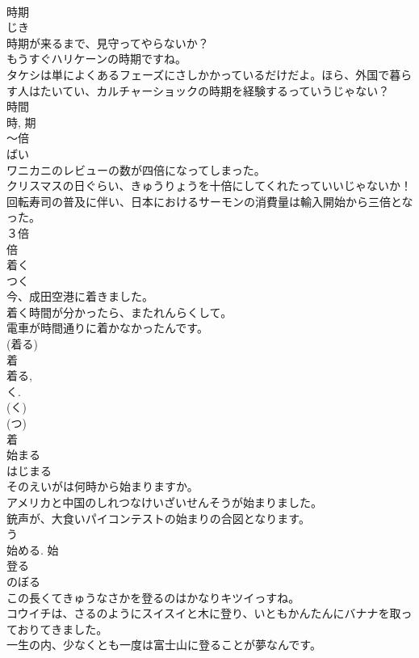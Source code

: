 \documentclass[8pt]{extreport}
\begin{document}
\begin{CJK}{UTF8}{min}
\\	時期	
\\	じき	
\\	時期が来るまで、見守ってやらないか？	
\\	もうすぐハリケーンの時期ですね。	
\\	タケシは単によくあるフェーズにさしかかっているだけだよ。ほら、外国で暮らす人はたいてい、カルチャーショックの時期を経験するっていうじゃない？	
\\	時間 
\\	時, 期	
\\	〜倍	
\\	ばい	
\\	ワニカニのレビューの数が四倍になってしまった。	
\\	クリスマスの日ぐらい、きゅうりょうを十倍にしてくれたっていいじゃないか！	
\\	回転寿司の普及に伴い、日本におけるサーモンの消費量は輸入開始から三倍となった。	
\\	３倍 
\\	倍	
\\	着く	
\\	つく	
\\	今、成田空港に着きました。	
\\	着く時間が分かったら、またれんらくして。	
\\	電車が時間通りに着かなかったんです。	
\\	(着る) 
\\	着 
\\	着る, 
\\	く. 
\\	(く) 
\\	(つ) 
\\	着	
\\	始まる	
\\	はじまる	
\\	そのえいがは何時から始まりますか。	
\\	アメリカと中国のしれつなけいざいせんそうが始まりました。	
\\	銃声が、大食いパイコンテストの始まりの合図となります。	
\\	う 
\\	始める.	始	
\\	登る	
\\	のぼる	
\\	この長くてきゅうなさかを登るのはかなりキツイっすね。	
\\	コウイチは、さるのようにスイスイと木に登り、いともかんたんにバナナを取っておりてきました。	
\\	一生の内、少なくとも一度は富士山に登ることが夢なんです。	

\end{CJK}
\end{document}
